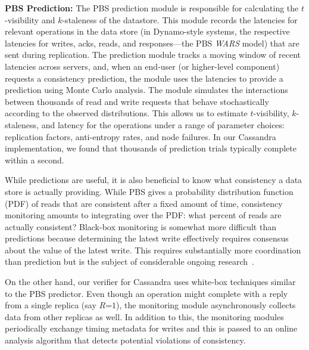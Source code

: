 \noindent\textbf{PBS Prediction:} The PBS prediction module is
responsible for calculating the $t$-visibility and $k$-staleness of
the datastore. This module records the latencies for relevant
operations in the data store (in Dynamo-style systems, the respective
latencies for writes, acks, reads, and responses---the PBS
\textit{WARS} model) that are sent during replication.  The prediction
module tracks a moving window of recent latencies across servers, and,
when an end-user (or higher-level component) requests a consistency
prediction, the module uses the latencies to provide a prediction
using Monte Carlo analysis. The module simulates the interactions
between thousands of read and write requests that behave
stochastically according to the observed distributions. This allows us
to estimate $t$-visibility, $k$-staleness, and latency for the
operations under a range of parameter choices: replication factors,
anti-entropy rates, and node failures. In our Cassandra
implementation, we found that thousands of prediction trials typically
complete within a second.

 While predictions are useful, it is
also beneficial to know what consistency a data store is actually providing.
While PBS gives a probability distribution function (PDF) of reads that are
consistent after a fixed amount of time, consistency monitoring amounts to
integrating over the PDF: what percent of reads are actually consistent?
Black-box monitoring is somewhat more difficult than predictions because
determining the latest write effectively requires consensus about the value of
the latest write. This requires substantially more coordination than prediction
but is the subject of considerable ongoing research~\cite{hotdep}. 

On the other hand, our verifier for Cassandra uses white-box techniques similar
to the PBS predictor. Even though an operation might complete with a reply
from a single replica (say $R$=$1$), the monitoring module asynchronously collects 
data from other replicas as well. In addition to this, the monitoring modules
periodically exchange timing metadata for writes and this is passed to an online
analysis algorithm that detects potential violations of consistency.

